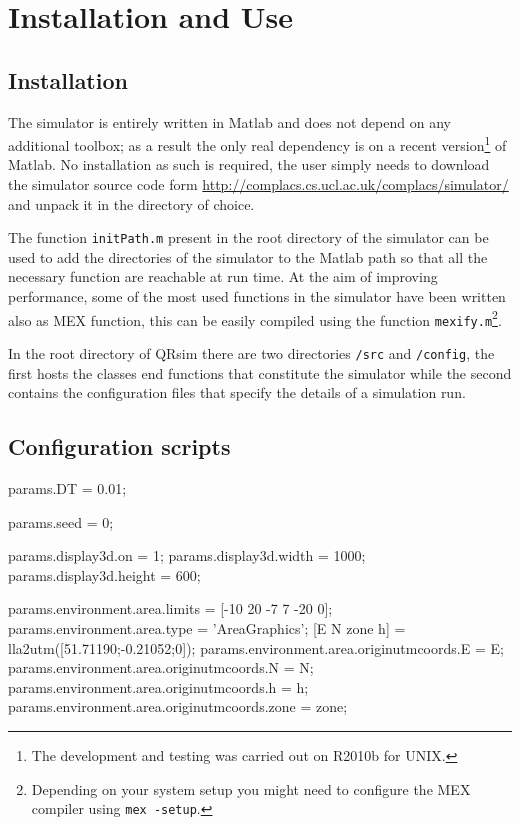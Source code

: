 \documentclass[a4paper,11pt]{report}
\newcommand{\sname}{QRsim\xspace}
\newcommand{\web}{\url{http://complacs.cs.ucl.ac.uk/complacs/simulator/}\xspace}
\begin{document}
\chapter{Installation and Use}

\section{Installation}
The simulator is entirely written in Matlab and does not depend on any additional toolbox; as a result the only real dependency is on a recent version\footnote{The development and testing was carried out on R2010b for UNIX.} of Matlab.
No installation as such is required, the user simply needs to download the simulator source code form \web and unpack it in the directory of choice.

The function \texttt{initPath.m} present in the root directory of the simulator can be used to add the directories of the simulator to the Matlab path so that all the necessary function are reachable at run time.
At the aim of improving performance, some of the most used functions in the simulator have been written also as MEX function, this can be easily compiled using the function \texttt{mexify.m}\footnote{Depending on your system setup you might need to configure the MEX compiler using \texttt{mex -setup}.}.
 
In the root directory of \sname there are two directories \texttt{/src} and \texttt{/config}, the first hosts the classes end functions that constitute the simulator while the second contains the configuration files that specify the details of a simulation run.


\section{Configuration scripts}  \label{sec:config}



params.DT = 0.01;

params.seed = 0; %

params.display3d.on = 1;
params.display3d.width = 1000;
params.display3d.height = 600;


params.environment.area.limits = [-10 20 -7 7 -20 0];
params.environment.area.type = 'AreaGraphics';
[E N zone h] = lla2utm([51.71190;-0.21052;0]);
params.environment.area.originutmcoords.E = E;
params.environment.area.originutmcoords.N = N;
params.environment.area.originutmcoords.h = h;  
params.environment.area.originutmcoords.zone =  zone;
\end{document}
